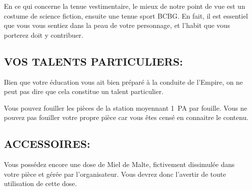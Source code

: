 \documentclass[14pt,twocolumn]{extarticle}
\begin{document}
En ce qui concerne la tenue vestimentaire, le mieux de notre point de vue est
un costume de science fiction, ensuite une tenue sport BCBG. En fait, il est
essentiel que vous vous sentiez dans la peau de votre personnage, et l'habit
que vous porterez doit y contribuer.

\subsection{VOS TALENTS PARTICULIERS:}

Bien que votre éducation vous ait bien préparé à la conduite de l'Empire, on
ne peut pas dire que cela constitue un talent particulier.

Vous pouvez fouiller les pièces de la station moyennant 1~PA par fouille. Vous
ne pouvez pas fouiller votre propre pièce car vous êtes censé en connaitre le
contenu.

\subsection{ACCESSOIRES:}

Vous possédez encore une dose de Miel de Malte, fictivement dissimulée dans
votre pièce et gérée par l'organisateur. Vous devrez donc l'avertir de toute
utilisation de cette dose.
\end{document}
